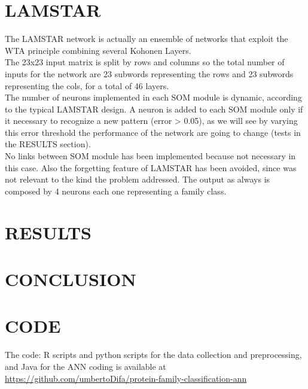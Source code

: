 \documentclass[a4paper, 10pt, conference]{ieeeconf}      %
\begin{document}
\section{LAMSTAR}\label{sec:lamstar}
The LAMSTAR\cite{graupe} network is actually an ensemble of networks that exploit the WTA principle combining several Kohonen Layers.\\
The 23x23 input matrix is split by rows and columns so the total number of inputs for the network are 23 subwords representing the rows and 23 subwords representing the cols, for a total of 46 layers.\\
The number of neurons implemented in each
SOM module is dynamic, according to the typical
LAMSTAR design. A neuron is added to each
SOM module only if it necessary to recognize a
new pattern (error > 0.05), as we will see by varying this error threshold the performance of the network are going to change (tests in the RESULTS section).\\
No links between SOM module has been implemented because not necessary in this case. Also the forgetting feature of LAMSTAR
has been avoided, since was not relevant to the kind the problem addressed. The output as always is composed by 4 neurons each one representing a family class.\\

\section{RESULTS}\label{sec:results}

\section{CONCLUSION}\label{sec:conclusion}

\section{CODE}
The code: R scripts and python scripts for the data collection and preprocessing, and Java for the ANN coding is available at 
\href{https://github.com/umbertoDifa/protein-family-classification-ann}{https://github.com/umbertoDifa/protein-family-classification-ann}
\end{document}
